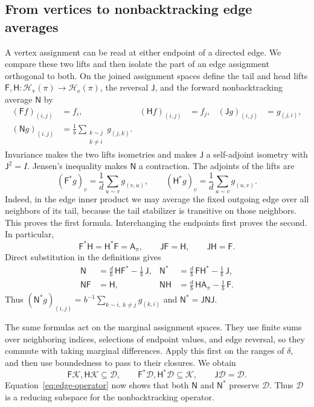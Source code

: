 \subsection{From vertices to nonbacktracking edge averages}

A vertex assignment can be read at either endpoint of a directed
edge.  We compare these two lifts and then isolate the part of an
edge assignment orthogonal to both.  On the joined assignment spaces define
the tail and head lifts
\(\mathsf F,\mathsf H:\mathcal H_{\mathrm v}(\pi)\to
\mathcal H_{\mathrm e}(\pi)\), the reversal \(\mathsf J\), and
the forward nonbacktracking average \(\mathsf N\) by
\begin{align*}
 (\mathsf Ff)_{(i,j)}&=f_i,&
 (\mathsf Hf)_{(i,j)}&=f_j,&
 (\mathsf Jg)_{(i,j)}&=g_{(j,i)},\\
 (\mathsf Ng)_{(i,j)}
   &=\frac1b\sum_{\substack{k\sim j\\k\ne i}}g_{(j,k)}.
\end{align*}
Invariance makes the two lifts isometries and makes \(\mathsf J\)
a self-adjoint isometry with \(\mathsf J^2=I\).  Jensen's inequality
makes \(\mathsf N\) a contraction.  The adjoints of the lifts are
\begin{equation}
\label{eq:lift-adjoints}
 (\mathsf F^*g)_v=\frac1d\sum_{u\sim v}g_{(v,u)},\qquad
 (\mathsf H^*g)_v=\frac1d\sum_{u\sim v}g_{(u,v)}.
\end{equation}
Indeed, in the edge inner product we may average the fixed outgoing
edge over all neighbors of its tail, because the tail stabilizer is
transitive on those neighbors.  This proves the first formula.
Interchanging the endpoints first proves the second.  In particular,
\[
 \mathsf F^*\mathsf H=\mathsf H^*\mathsf F=\mathsf A_\pi,\qquad
 \mathsf J\mathsf F=\mathsf H,\qquad
 \mathsf J\mathsf H=\mathsf F.
\]
Direct substitution in the definitions gives
\begin{align}
 \mathsf N&=\frac db\,\mathsf H\mathsf F^*-\frac1b\,\mathsf J,
 &\mathsf N^*&=\frac db\,\mathsf F\mathsf H^*-\frac1b\,\mathsf J,
 \label{eq:edge-operator}\\
 \mathsf N\mathsf F&=\mathsf H,
 &\mathsf N\mathsf H&=\frac db\,\mathsf H\mathsf A_\pi-\frac1b\,\mathsf F.
 \label{eq:edge-lifts}
\end{align}
Thus
\((\mathsf N^*g)_{(i,j)}
=b^{-1}\sum_{k\sim i,\ k\ne j}g_{(k,i)}\)
and \(\mathsf N^*=\mathsf J\mathsf N\mathsf J\).

The same formulas act on the marginal assignment spaces.  They use
finite sums over neighboring indices, selections of endpoint values,
and edge reversal, so they commute with taking marginal differences.
Apply this first on the ranges of \(\delta\), and then
use boundedness to pass to their closures.  We obtain
\[
 \mathsf F\mathcal K,\mathsf H\mathcal K\subseteq\mathcal D,\qquad
 \mathsf F^*\mathcal D,\mathsf H^*\mathcal D\subseteq\mathcal K,
 \qquad \mathsf J\mathcal D=\mathcal D.
\]
Equation~\eqref{eq:edge-operator} now shows that both \(\mathsf N\)
and \(\mathsf N^*\) preserve \(\mathcal D\).  Thus \(\mathcal D\)
is a reducing subspace for the nonbacktracking operator.


